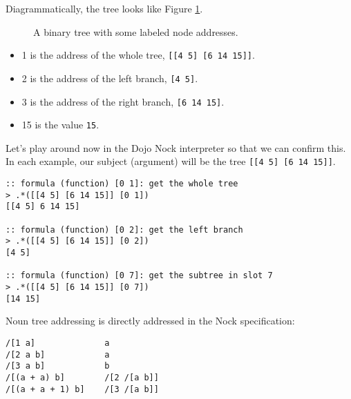 \documentclass[twoside]{article}
\begin{document}
Diagrammatically, the tree looks like Figure \ref{fig:tree45}.

\begin{figure}[t]
  \centering
  \caption{A binary tree with some labeled node addresses. \label{fig:tree45}}
  {
  }
  \end{figure}

\begin{itemize}
  \item  1 is the address of the whole tree, \lstinline[style=inlinecode]{[[4 5] [6 14 15]]}.
  \item  2 is the address of the left branch, \lstinline[style=inlinecode]{[4 5]}.
  \item  3 is the address of the right branch, \lstinline[style=inlinecode]{[6 14 15]}.
  \item  15 is the value \lstinline[style=inlinecode]{15}.
\end{itemize}

Let's play around now in the Dojo Nock interpreter so that we can confirm this. In each example, our subject (argument) will be the tree \lstinline[style=inlinecode]{[[4 5] [6 14 15]]}.

\begin{lstlisting}[style=listingcode]
:: formula (function) [0 1]: get the whole tree
> .*([[4 5] [6 14 15]] [0 1])
[[4 5] 6 14 15]

:: formula (function) [0 2]: get the left branch
> .*([[4 5] [6 14 15]] [0 2])
[4 5]

:: formula (function) [0 7]: get the subtree in slot 7
> .*([[4 5] [6 14 15]] [0 7])
[14 15]
\end{lstlisting}

Noun tree addressing is directly addressed in the Nock specification:

\begin{lstlisting}[style=listingcode]
/[1 a]              a
/[2 a b]            a
/[3 a b]            b
/[(a + a) b]        /[2 /[a b]]
/[(a + a + 1) b]    /[3 /[a b]]
\end{lstlisting}
\end{document}
